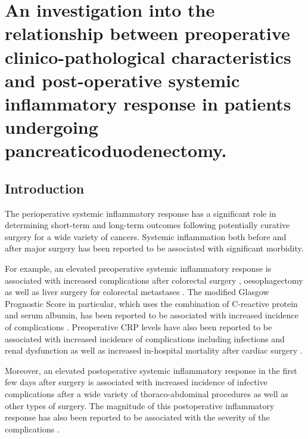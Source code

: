 \chapter{An investigation into the relationship between preoperative clinico-pathological characteristics and post-operative systemic inflammatory response in patients undergoing pancreaticoduodenectomy.}
\label{ch_pre_post_sirs}


\clearpage

\section{Introduction}
The perioperative systemic inflammatory response has a significant role in determining short-term and long-term outcomes following potentially curative surgery for a wide variety of cancers. Systemic inflammation both before and after major surgery has been reported to be associated with significant morbidity. 

For example, an elevated preoperative systemic inflammatory response is associated with increased complications after colorectal surgery \parencite{moyes_preoperative_2009, kubo_elevated_2013}, oesophagectomy \parencite{vashist_glasgow_2010} as well as liver surgery for colorectal metastases \parencite{neal_preoperative_2011}. 
The modified Glasgow Prognostic Score in particular, which uses the combination of C-reactive protein and serum albumin, has been reported to be associated with increased incidence of complications \parencite{moyes_preoperative_2009, mohri_correlation_2014, vashist_glasgow_2010}.
Preoperative CRP levels have also been reported to be associated with increased incidence of complications including infections and renal dysfunction as well as increased in-hospital mortality after cardiac surgery \parencite{lorenzo_increased_2012, mezzomo_preoperative_2011, kim_predictive_2009, biancari_preoperative_2003, boeken_increased_1998}.

Moreover, an elevated postoperative systemic inflammatory response in the first few days after surgery is associated with increased incidence of infective complications after a wide variety of thoraco-abdominal procedures\parencite{platt_c-reactive_2012, dutta_persistent_2011, welsch_persisting_2008} as well as other types of surgery\parencite{mcneer_early_2010, laporta_baez_c-reactive_2011}.
The magnitude of this postoperative inflammatory response has also been reported to be associated with the severity of the complications \parencite{mcsorley_postoperative_2015}. 

